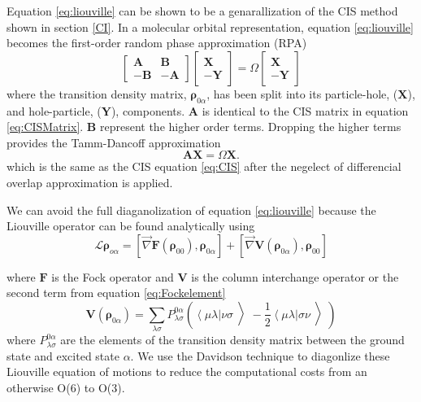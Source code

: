     Equation \ref{eq:liouville} can be shown to be a genarallization of the CIS method shown in section \ref{CI}.
    In a molecular orbital representation, equation \ref{eq:liouville} becomes the first-order random phase approximation (RPA)
    \begin{equation}
      \begin{bmatrix} 
        \mathbf{A} & \mathbf{B} \\
        -\mathbf{B} & -\mathbf{A}
      \end{bmatrix}
      \begin{bmatrix} 
        \mathbf{X}\\
        -\mathbf{Y}
      \end{bmatrix} = \Omega
      \begin{bmatrix} 
        \mathbf{X}\\
        -\mathbf{Y}
      \end{bmatrix}
    \end{equation}
    where the transition density matrix, \(\bm{\rho}_{0\alpha}\), has been split into its particle-hole, (\(\mathbf{X}\)), and hole-particle, (\(\mathbf{Y}\)), components.
    \(\mathbf{A}\) is identical to the CIS matrix in equation \ref{eq:CISMatrix}.
    \(\mathbf{B}\) represent the higher order terms.
    Dropping the higher terms provides the Tamm-Dancoff approximation \cite{dunning1967nonempirical}
    \begin{equation}
      \mathbf{A} \mathbf{X} = \Omega \mathbf{X}.
    \end{equation}
    which is the same as the CIS equation \ref{eq:CIS} after the negelect of differencial overlap approximation is applied.

    We can avoid the full diaganolization of equation \ref{eq:liouville} because the Liouville operator can be found analytically using
    \begin{equation}
      \mathcal{L} \bm{\rho}_{o\alpha} = \left[ \vec{\nabla} \mathbf{F}(\bm{\rho}_{00}),\bm{\rho}_{0\alpha} \right] +
      \left[ \vec{\nabla} \mathbf{V}(\bm{\rho}_{0\alpha}), \bm{\rho}_{00} \right]
    \end{equation}

    where \(\mathbf{F}\) is the Fock operator and \(\mathbf{V}\) is the column interchange operator or the second term from equation \ref{eq:Fockelement}
    \begin{equation}\label{eq:ColumnInterchange}
      \mathbf{V}(\bm{\rho}_{0\alpha}) = \sum_{\lambda \sigma} P^{0\alpha}_{\lambda \sigma}
      \left(
      \left< \mu \lambda \right| \nu \sigma \left>\right.
      - \frac{1}{2} \left< \mu \lambda \right| \sigma \nu \left>\right.
      \right)
    \end{equation}
    where \(P^{0\alpha}_{\lambda \sigma}\) are the elements of the transition density matrix between the ground state and excited state \(\alpha\).
We use the Davidson technique to diagonlize these Liouville equation of motions to reduce the computational costs from an otherwise O(6) to O(3). \cite{nelson2011nonadiabatic}

